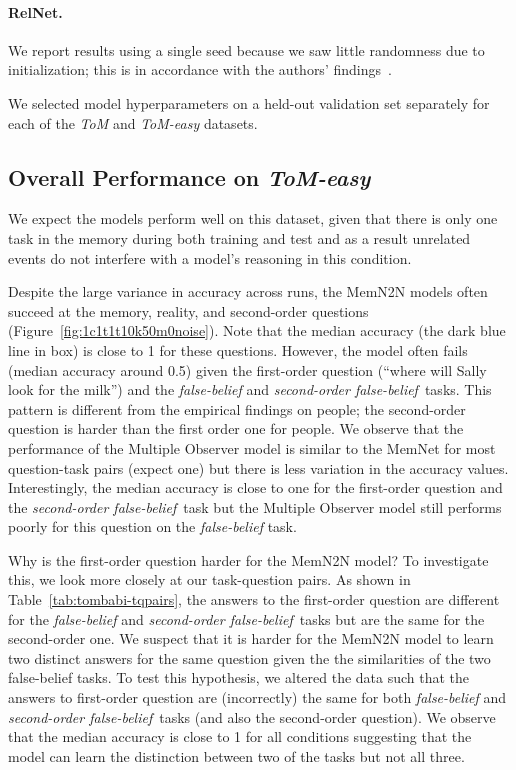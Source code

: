 \paragraph{RelNet.}
We report results using a single seed because we saw little randomness due to initialization; this is in accordance with the authors' findings~\citep{santoro.etal.2017}.

We selected model hyperparameters on a held-out validation set separately for each of the \textit{ToM} and \textit{ToM-easy} datasets.

\subsection{Overall Performance on \textit{ToM-easy}}

We expect the models perform well on this dataset, given that there is only one task in the memory during both training and test and as a result unrelated events do not interfere with a model's reasoning in this condition.  

Despite the large variance in accuracy across runs, the MemN2N models often succeed at the memory, reality, and second-order questions
(Figure~\ref{fig:1c1t1t10k50m0noise}). Note that the median accuracy (the dark blue line in box) is close to 1 for these questions. However, the model often fails (median accuracy around 0.5) given the first-order question (``where will Sally look for the milk'') and  the \textit{false-belief} and \textit{second-order false-belief}\, tasks. This pattern is different from the empirical findings on people; the second-order question is harder than the first order one for people. We observe that the performance of the Multiple Observer model is similar to the MemNet for most question-task pairs (expect one) but there is less variation in the accuracy values. Interestingly, the median accuracy is close to one for the first-order question and the \textit{second-order false-belief}\, task but the Multiple Observer model still performs poorly for this question on the
\textit{false-belief} task.

Why is the first-order question harder for the MemN2N model? To investigate this, we look more closely at our task-question pairs. As shown in
Table~\ref{tab:tombabi-tqpairs}, the answers to the first-order question are different for the \textit{false-belief} and \textit{second-order false-belief}\, tasks but are the same for the second-order one. We suspect that it is harder for the MemN2N model to learn two distinct answers for the same question given the the similarities of the two false-belief tasks. To test this hypothesis, we altered the data such that the answers to first-order question are (incorrectly) the same for both \textit{false-belief} and
\textit{second-order false-belief}\, tasks (and also the second-order question). We observe that the median accuracy is close to 1 for all conditions suggesting that the model can learn the distinction between two of the tasks but not all three.

